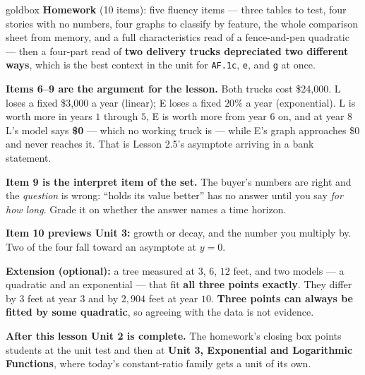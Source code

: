 \documentclass[10pt]{article}
\begin{document}
\boxguard[18]
\begin{skillbox}{goldbox}
\textbf{Homework} (10 items): five fluency items --- three tables to test, four stories with no
numbers, four graphs to classify by feature, the whole comparison sheet from memory, and a full
characteristics read of a fence-and-pen quadratic --- then a four-part read of \textbf{two delivery
trucks depreciated two different ways}, which is the best context in the unit for
\texttt{AF.1c}, \texttt{e}, and \texttt{g} at once.

\textbf{Items 6--9 are the argument for the lesson.} Both trucks cost \$24{,}000. L loses a fixed
\$3{,}000 a year (linear); E loses a fixed $20\%$ a year (exponential). L is worth more in years $1$
through $5$, E is worth more from year $6$ on, and at year $8$ L's model says \textbf{\$0} --- which
no working truck is --- while E's graph approaches \$0 and never reaches it. That is Lesson 2.5's
asymptote arriving in a bank statement.

\textbf{Item 9 is the interpret item of the set.} The buyer's numbers are right and the
\emph{question} is wrong: ``holds its value better'' has no answer until you say \emph{for how long}.
Grade it on whether the answer names a time horizon.

\textbf{Item 10 previews Unit 3:} growth or decay, and the number you multiply by. Two of the four
fall toward an asymptote at $y=0$.

\textbf{Extension (optional):} a tree measured at $3$, $6$, $12$ feet, and two models --- a quadratic
and an exponential --- that fit \textbf{all three points exactly}. They differ by $3$ feet at year $3$
and by $2{,}904$ feet at year $10$. \textbf{Three points can always be fitted by some quadratic}, so
agreeing with the data is not evidence.

\textbf{After this lesson Unit 2 is complete.} The homework's closing box points students at the unit
test and then at \textbf{Unit 3, Exponential and Logarithmic Functions}, where today's constant-ratio
family gets a unit of its own.
\end{skillbox}
\end{document}
